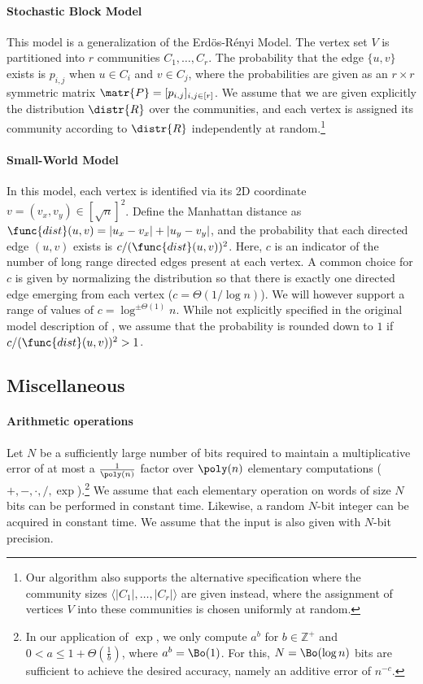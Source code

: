 \paragraph{Stochastic Block Model}
This model is a generalization of the Erd\"{o}s-R\'{e}nyi Model. The vertex set $V$ is partitioned into $r$ communities $C_1, \ldots, C_r$. The probability that the edge $\{u,v\}$ exists is $p_{i,j}$ when $u\in C_i$ and $v\in C_j$, where the probabilities are given as an $r\times r$ symmetric matrix $\matr{P} = [p_{i,j}]_{i,j \in [r]}$.
We assume that we are given explicitly the distribution $\distr{R}$ over the communities, and
each vertex is assigned its community according to $\distr{R}$ independently at random.\footnote{Our algorithm also supports the alternative specification where the community sizes $\langle |C_1|, \ldots, |C_r|\rangle$ are given instead, where the assignment of vertices $V$ into these communities is chosen uniformly at random.}

\paragraph{Small-World Model}
In this model, each vertex is identified via its 2D coordinate $v = (v_x, v_y) \in [\sqrt{n}]^2$. Define the Manhattan distance as $\func{dist}(u,v)=|u_x-v_x|+|u_y-v_y|$, and the probability that each directed edge $(u,v)$ exists is $c/(\func{dist}(u,v))^{2}$. Here, $c$ is an indicator of the number of long range directed edges present at each vertex. A common choice for $c$ is given by normalizing the distribution so that there is exactly one directed edge emerging from each vertex ($c = \Theta(1/\log n)$).
We will however support a range of values of $c=\log^{\pm\Theta(1)}n$.
While not explicitly specified in the original model description of \cite{kleinberg}, we assume that the probability is rounded down to $1$ if $c/(\func{dist}(u,v))^{2} > 1$.


\subsection{Miscellaneous}

\paragraph{Arithmetic operations} Let $N$ be a sufficiently large number of bits required to maintain a multiplicative error of at most a $\frac{1}{\poly(n)}$ factor over $\poly(n)$ elementary computations ($+, -, \cdot, /, \exp$).\footnote{In our application of $\exp$, we only compute $a^b$ for $b \in \mathbb{Z}^+$ and $0 < a \leq 1+\Theta(\frac{1}{b})$, where $a^b = \Bo(1)$. For this, $N=\Bo(\log n)$ bits are sufficient to achieve the desired accuracy, namely an additive error of $n^{-c}$.} We assume that each elementary operation on words of size $N$ bits can be performed in constant time. Likewise, a random $N$-bit integer can be acquired in constant time. We assume that the input is also given with $N$-bit precision. %

